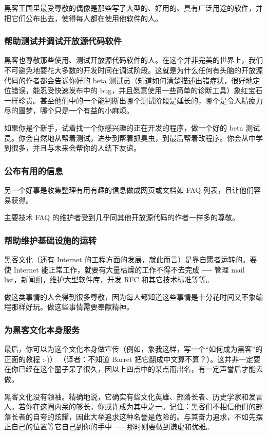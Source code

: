 黑客王国里最受尊敬的偶像是那些写了大型的、好用的、具有广泛用途的软件，并把它们公布出去，使得每人都在使用他软件的人。


\subsubsection{帮助测试并调试开放源代码软件}
黑客也尊敬那些使用、测试开放源代码软件的人。在这个并非完美的世界上，我们不可避免地要花大多数的开发时间在调试阶段。这就是为什么任何有头脑的开放源代码的作者都会告诉你好的 beta 测试员（知道如何清楚描述出错症状，很好地定位错误，能忍受快速发布中的 bug，并且愿意使用一些简单的诊断工具）象红宝石一样珍贵。甚至他们中的一个能判断出哪个测试阶段是延长的，哪个是令人精疲力尽的噩梦，哪个只是一个有益的小麻烦。

如果你是个新手，试着找一个你感兴趣的正在开发的程序，做一个好的 beta 测试员。你会自然地从帮着测试，进步到帮着抓臭虫，到最后帮着改程序。你会从中学到很多，并且与未来会帮你的人结下友谊。


\subsubsection{公布有用的信息}
另一个好事是收集整理有用有趣的信息做成网页或文档如 FAQ 列表，且让他们容易获得。

主要技术 FAQ 的维护者受到几乎同其他开放源代码的作者一样多的尊敬。


\subsubsection{帮助维护基础设施的运转}
黑客文化（还有 Internet 的工程方面的发展，就此而言）是靠自愿者运转的。要使 Internet 能正常工作，就要有大量枯燥的工作不得不去完成 ── 管理 mail list，新闻组，维护大型软件库，开发 RFC 和其它技术标准等等。

做这类事情的人会得到很多尊敬，因为每人都知道这些事情是十分花时间又不象编程那样好玩。做这些事情需要奉献精神。


\subsubsection{为黑客文化本身服务}
最后，你可以为这个文化本身做宣传（例如，象我这样，写一个“如何成为黑客”的正面的教程 :-)） （译者：不知道 Barret 把它翻成中文算不算？）。这并非一定要在你已经在这个圈子呆了很久，因以上四点中的某点而出名，有一定声誉后才能去做。

黑客文化没有领袖。精确地说，它确实有些文化英雄、部落长者、历史学家和发言人。若你在这圈内呆的够长，你或许成为其中之一。记住：黑客们不相信他们的部落长者的自夸的炫耀，因此大举追求这种名誉是危险的。与其奋力追求，不如先摆正自己的位置等它自己到你的手中 ── 那时则要做到谦虚和优雅。


